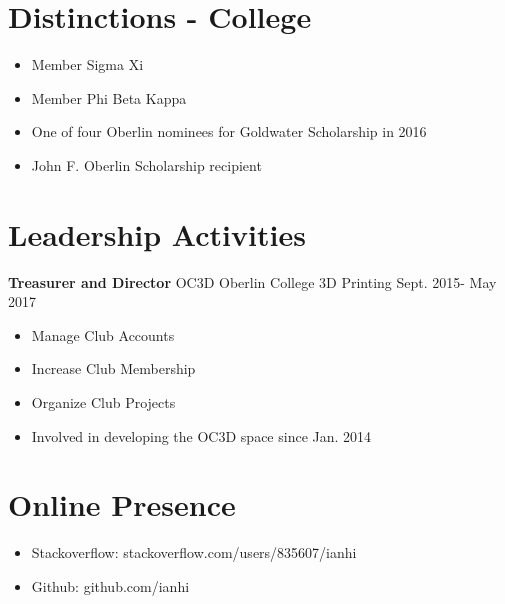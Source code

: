 \documentclass[margin]{res}
\begin{document}
\begin{resume}
	 \section{Distinctions - College}
	 \begin{itemize} \itemsep -2pt
		\item Member Sigma Xi
		\item Member Phi Beta Kappa
		\item One of four Oberlin nominees for Goldwater Scholarship in 2016
		\item John F. Oberlin Scholarship recipient
	\end{itemize}
	\section{Leadership   Activities} 
	{\bf Treasurer and Director} OC3D Oberlin College 3D Printing    \hfill         Sept. 2015- May 2017 
	\begin{itemize} \itemsep -2pt
		\item  Manage Club Accounts
		\item  Increase Club Membership
		\item  Organize Club Projects
		\item Involved in developing the OC3D space since Jan. 2014
	\end{itemize}
	
	\section{Online Presence}
	\begin{itemize} \itemsep -2pt  %
		\item Stackoverflow: stackoverflow.com/users/835607/ianhi
		\item Github:  github.com/ianhi 
	\end{itemize}


	
\end{resume} 
\end{document}
